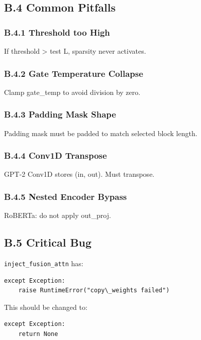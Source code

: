 \subsection{B.4 Common Pitfalls}

\subsubsection{B.4.1 Threshold too High}

If threshold \textgreater{} test L, sparsity never activates.

\subsubsection{B.4.2 Gate Temperature Collapse}

Clamp gate\_temp to avoid division by zero.

\subsubsection{B.4.3 Padding Mask Shape}

Padding mask must be padded to match selected block length.

\subsubsection{B.4.4 Conv1D Transpose}

GPT-2 Conv1D stores (in, out). Must transpose.

\subsubsection{B.4.5 Nested Encoder Bypass}

RoBERTa: do not apply out\_proj.

\subsection{B.5 Critical Bug}

\texttt{inject\_fusion\_attn} has:

\begin{lstlisting}
except Exception:
    raise RuntimeError("copy\_weights failed")
\end{lstlisting}

This should be changed to:

\begin{lstlisting}
except Exception:
    return None
\end{lstlisting}

